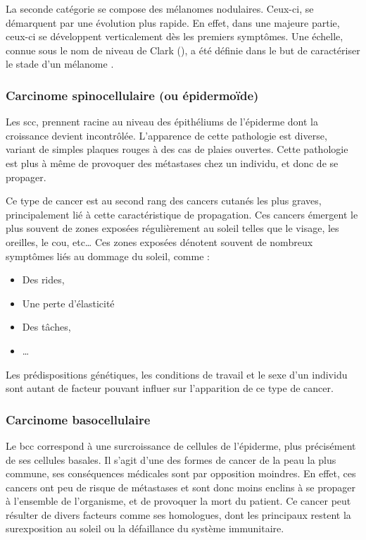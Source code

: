 \addtocounter{footnote}{1}
La seconde catégorie se compose des mélanomes nodulaires. Ceux-ci, se démarquent par une évolution plus rapide. En effet, dans une majeure partie, ceux-ci se développent verticalement dès les premiers symptômes. Une échelle, connue sous le nom de niveau de Clark (), a été définie dans le but de caractériser le stade d’un mélanome \cite{Clark1969}.\par

\subsubsection{Carcinome spinocellulaire (ou épidermoïde)}
Les \gls{scc}, prennent racine au niveau des épithéliums de l’épiderme dont la croissance devient incontrôlée. L’apparence de cette pathologie est diverse, variant de simples plaques rouges à des cas de plaies ouvertes. Cette pathologie est plus à même de provoquer des métastases chez un individu, et donc de se propager.\par

Ce type de cancer est au second rang des cancers cutanés les plus graves, principalement lié à cette caractéristique de propagation. Ces cancers émergent le plus souvent de zones exposées régulièrement au soleil telles que le visage, les oreilles, le cou, etc… Ces zones exposées dénotent souvent de nombreux symptômes liés au dommage du soleil, comme :
\begin{itemize}
\item Des rides,
\item Une perte d’élasticité
\item Des tâches,
\item \ldots
\end{itemize}
Les prédispositions génétiques, les conditions de travail et le sexe d’un individu sont autant de facteur pouvant influer sur l’apparition de ce type de cancer.\par

\subsubsection{Carcinome basocellulaire}	
Le \gls{bcc} correspond à une surcroissance de cellules de l’épiderme, plus précisément de ses cellules basales. Il s’agit d’une des formes de cancer de la peau la plus commune, ses conséquences médicales sont par opposition moindres. En effet, ces cancers ont peu de risque de métastases et sont donc moins enclins à se propager à l’ensemble de l’organisme, et de provoquer la mort du patient. Ce cancer peut résulter de divers facteurs comme ses homologues, dont les principaux restent la surexposition au soleil ou la défaillance du système immunitaire.\par

